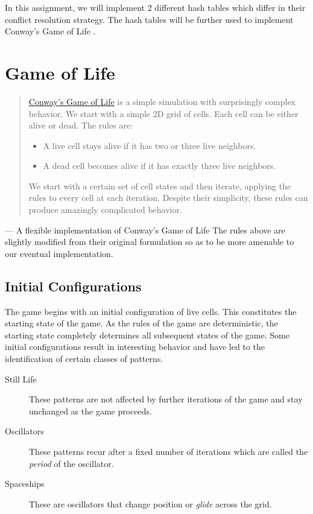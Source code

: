 \documentclass[addpoints]{exam}
\begin{document}
In this assignment, we will implement 2 different hash tables which differ in their conflict resolution strategy. The hash tables will be further used to implement Conway's Game of Life \cite{wp_gol}.

\section{Game of Life}
\label{sec:imgops}

\begin{quotation}
\href{https://en.wikipedia.org/wiki/Conway's_Game_of_Life}{Conway’s Game of Life} is a simple simulation with surprisingly complex behavior. We start with a simple 2D grid of cells. Each cell can be either alive or dead. The rules are:
\begin{itemize}
\item A live cell stays alive if it has two or three live neighbors.
\item A dead cell becomes alive if it has exactly three live neighbors.
\end{itemize}
We start with a certain set of cell states and then iterate, applying the rules to every cell at each iteration. Despite their simplicity, these rules can produce amazingly complicated behavior.
\end{quotation}
\raggedleft --- A flexible implementation of Conway's Game of Life \cite{gol_impl}
\justify
The rules above are slightly modified from their original formulation so as to be more amenable to our eventual implementation.

\subsection{Initial Configurations}

The game begins with an initial configuration of live cells. This constitutes the starting state of the game. As the rules of the game are deterministic, the starting state completely determines all subsequent states of the game. Some initial configurations result in interesting behavior and have led to the identification of certain classes of patterns.
\begin{description}
\item[Still Life] These patterns are not affected by further iterations of the game and stay unchanged as the game proceeds.
\item[Oscillators] These patterns recur after a fixed number of iterations which are called the \textit{period} of the oscillator.
\item[Spaceships] These are oscillators that change position or \textit{glide} across the grid.
\end{description}
\end{document}
